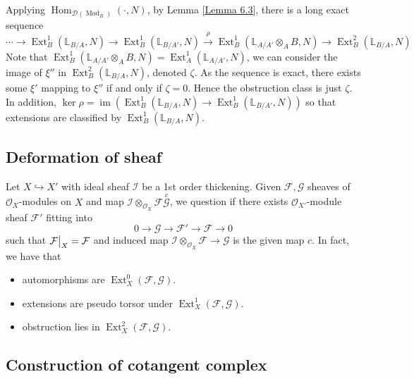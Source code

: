 \documentclass{ctexart}
\renewcommand{\hom}{\operatorname{Hom}}
\newcommand{\im}{\operatorname{im}}
\newcommand{\ext}{\operatorname{Ext}}
\newcommand{\module}{\operatorname{Mod}}
\begin{document}
Applying $\hom_{\mathcal{D}(\module_{B})}(\cdot, N)$, by Lemma \ref{Lemma 6.3}, there is a long exact sequence
\begin{equation}
    \cdots \rightarrow \ext_{B}^{1}(\mathbb{L}_{B/A}, N) \rightarrow \ext_{B}^{1}(\mathbb{L}_{B/A'}, N) \overset{\rho}{\rightarrow} \ext_{B}^{1}(\mathbb{L}_{A/A'} \otimes_{A} B, N) \rightarrow \ext_{B}^{2}(\mathbb{L}_{B/A}, N)
\end{equation}
Note that $\ext_{B}^{1}(\mathbb{L}_{A/A'} \otimes_{A} B, N) = \ext_{A}^{1}(\mathbb{L}_{A/A'}, N)$, we can consider the image of $\xi''$ in $\ext_{B}^{2}(\mathbb{L}_{B/A}, N)$, denoted $\zeta$.
As the sequence is exact, there exists some $\xi'$ mapping to $\xi''$ if and only if $\zeta = 0$.
Hence the obstruction class is just $\zeta$.
In addition, $\ker \rho = \im (\ext_{B}^{1}(\mathbb{L}_{B/A}, N) \rightarrow \ext_{B}^{1}(\mathbb{L}_{B/A'}, N))$ so that extensions are classified by $\ext_{B}^{1}(\mathbb{L}_{B/A}, N)$.

\subsection{Deformation of sheaf}
\label{subsection:Cotangent_Complex_Deformation_of_sheaf}

Let $X \hookrightarrow X'$ with ideal sheaf $\mathcal{I}$ be a 1st order thickening.
Given $\mathcal{F},\mathcal{G}$ sheaves of $\mathcal{O}_{X}$-modules on $X$ and map $\mathcal{I} \otimes_{\mathcal{O}_{X}} \mathcal{F} \overset{c}{\mathcal{G}}$,
we question if there exists $\mathcal{O}_{X'}$-module sheaf $\mathcal{F}'$ fitting into 
\begin{equation}
    0 \longrightarrow \mathcal{G} \longrightarrow \mathcal{F}' \longrightarrow \mathcal{F} \longrightarrow 0
\end{equation}  
such that $\mathcal{F}\big{|}_{X} = \mathcal{F}$ and induced map $\mathcal{I} \otimes_{\mathcal{O}_{X}} \mathcal{F} \rightarrow \mathcal{G}$ is the given map $c$.
In fact, we have that
\begin{itemize}
    \item automorphisms are $\ext_{X}^{0}(\mathcal{F}, \mathcal{G})$.
    \item extensions are pseudo torsor under $\ext_{X}^{1}(\mathcal{F}, \mathcal{G})$.
    \item obstruction lies in $\ext_{X}^{2}(\mathcal{F}, \mathcal{G})$.
\end{itemize}

\subsection{Construction of cotangent complex}
\label{subsection:Cotangent_Complex_Construction_of_cotangent_complex}
\end{document}
